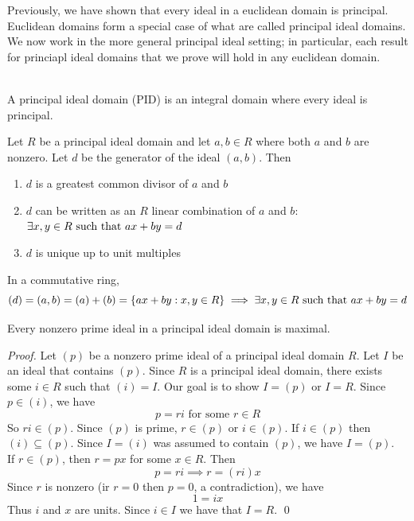 Previously, we have shown that every ideal in a euclidean domain is principal. Euclidean domains form a special case of what are called principal ideal domains. We now work in the more general principal ideal setting; in particular, each result for princiapl ideal domains that we prove will hold in any euclidean domain.

\begin{definition} \leavevmode \\
    A principal ideal domain (PID) is an integral domain where every ideal is principal.  
\end{definition}

\begin{proposition}
    Let $R$ be a principal ideal domain and let $a,b \in R$ where both $a$ and $b$ are nonzero. Let $d$ be the generator of the ideal $(a,b)$. Then 
    \begin{enumerate}
        \item $d$ is a greatest common divisor of $a$ and $b$
        \item $d$ can be written as an $R$ linear combination of $a$ and $b$: $\exists x,y \in R \text{ such that } ax + by = d$
        \item $d$ is unique up to unit multiples
    \end{enumerate}
    In a commutative ring,
    $$(d) = (a,b) = (a) + (b) = \left\{ax + by : x,y \in R\right\} \implies \exists x,y \in R \text{ such that } ax+by = d$$
\end{proposition}

\begin{proposition}
    Every nonzero prime ideal in a principal ideal domain is maximal.
\end{proposition}

\begin{proof}
    Let $(p)$ be a nonzero prime ideal of a principal ideal domain $R$. Let $I$ be an ideal that contains $(p)$. Since $R$ is a principal ideal domain, there exists some $i \in R$ such that $(i) = I$. Our goal is to show $I=(p)$ or $I = R$. Since $p \in (i)$, we have 
    $$p = ri \text{ for some } r \in R$$
    So $ri \in (p)$. Since $(p)$ is prime, $r \in (p)$ or $i \in (p).$ If $i \in (p)$ then $(i) \subseteq (p)$. Since $I = (i)$ was assumed to contain $(p)$, we have $I = (p)$. \\
    If $r \in (p)$, then $r = px$ for some $x \in R$. Then 
    $$p=ri \implies r =(ri)x$$
    Since $r$ is nonzero (ir $r = 0$ then $p = 0$, a contradiction), we have 
    $$1=ix$$
    Thus $i$ and $x$ are units. Since $i \in I$ we have that $I = R$.
    \qed
\end{proof}

